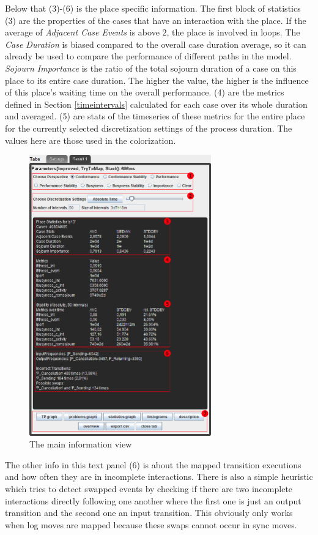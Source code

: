 Below that (3)-(6) is the place specific information.
The first block of statistics (3) are the properties of the cases that have an interaction with the place. If the average of \emph{Adjacent Case Events} is above $2$, the place is involved in loops. The \emph{Case Duration} is biased compared to the overall case duration average, so it can already be used to compare the performance of different paths in the model. \emph{Sojourn Importance} is the ratio of the total sojourn duration of a case on this place to its entire case duration. The higher the value, the higher is the influence of this place's waiting time on the overall performance.
(4) are the metrics defined in Section \ref{timeintervals} calculated for each case over its whole duration and averaged. (5) are stats of the timeseries of these metrics for the entire place for the currently selected discretization settings of the process duration. The values here are those used in the colorization.
\begin{figure}[H]
    \centering
    \includegraphics[width=0.7\textwidth]{figures/implementation/main_info_view.png}
    \caption{The main information view}
    \label{fig:maininfoview}
\end{figure}

The other info in this text panel (6) is about the mapped transition executions and how often they are in incomplete interactions. There is also a simple heuristic which tries to detect swapped events by checking if there are two incomplete interactions directly following one another where the first one is just an output transition and the second one an input transition. This obviously only works when log moves are mapped because these swaps cannot occur in sync moves.

